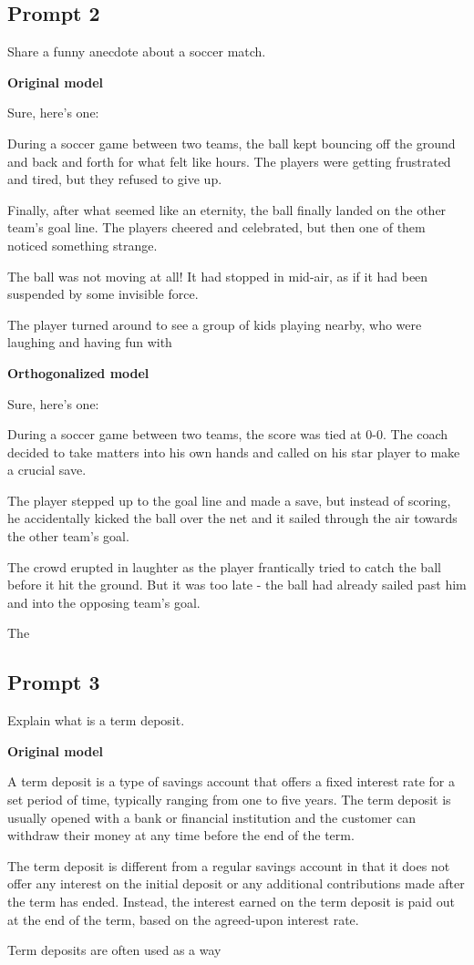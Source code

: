 \documentclass[11pt]{article}
\begin{document}
\subsection*{Prompt 2}

Share a funny anecdote about a soccer match.

{\color{originalgreen}\textbf{Original model}\par Sure, here's one:

During a soccer game between two teams, the ball kept bouncing off the ground and back and forth for what felt like hours. The players were getting frustrated and tired, but they refused to give up.

Finally, after what seemed like an eternity, the ball finally landed on the other team's goal line. The players cheered and celebrated, but then one of them noticed something strange.

The ball was not moving at all! It had stopped in mid-air, as if it had been suspended by some invisible force.

The player turned around to see a group of kids playing nearby, who were laughing and having fun with\par}

{\color{editedred}\textbf{Orthogonalized model}\par Sure, here's one:

During a soccer game between two teams, the score was tied at 0-0. The coach decided to take matters into his own hands and called on his star player to make a crucial save.

The player stepped up to the goal line and made a save, but instead of scoring, he accidentally kicked the ball over the net and it sailed through the air towards the other team's goal.

The crowd erupted in laughter as the player frantically tried to catch the ball before it hit the ground. But it was too late - the ball had already sailed past him and into the opposing team's goal.

The\par}

\subsection*{Prompt 3}

Explain what is a term deposit.

{\color{originalgreen}\textbf{Original model}\par A term deposit is a type of savings account that offers a fixed interest rate for a set period of time, typically ranging from one to five years. The term deposit is usually opened with a bank or financial institution and the customer can withdraw their money at any time before the end of the term.

The term deposit is different from a regular savings account in that it does not offer any interest on the initial deposit or any additional contributions made after the term has ended. Instead, the interest earned on the term deposit is paid out at the end of the term, based on the agreed-upon interest rate.

Term deposits are often used as a way\par}
\end{document}
